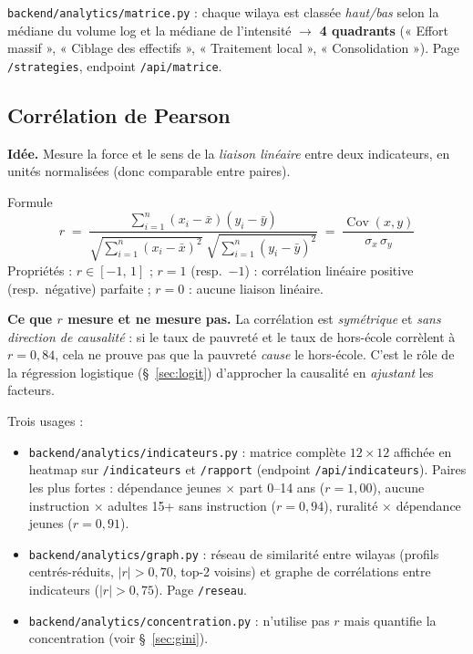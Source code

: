 \documentclass[11pt,a4paper]{article}
\newcommand{\txt}[1]{\texttt{#1}}
\begin{document}
\begin{where}
\txt{backend/analytics/matrice.py} : chaque wilaya est classée \emph{haut/bas}
selon la médiane du volume log et la médiane de l'intensité $\to$ \textbf{4
quadrants} (« Effort massif », « Ciblage des effectifs », « Traitement
local », « Consolidation »). Page \txt{/strategies}, endpoint \txt{/api/matrice}.
\end{where}

\subsection{Corrélation de Pearson}
\label{sec:pearson}

\textbf{Idée.} Mesure la force et le sens de la \emph{liaison linéaire} entre
deux indicateurs, en unités normalisées (donc comparable entre paires).

\begin{meth}{Formule}
\[
r \;=\;
\frac{\sum_{i=1}^{n}(x_i-\bar{x})(y_i-\bar{y})}
{\sqrt{\sum_{i=1}^{n}(x_i-\bar{x})^2}\;\sqrt{\sum_{i=1}^{n}(y_i-\bar{y})^2}}
\;=\;\frac{\operatorname{Cov}(x,y)}{\sigma_x\,\sigma_y}
\]
Propriétés : $r\in[-1,\,1]$ ; $r=1$ (resp.\ $-1$) : corrélation linéaire
positive (resp.\ négative) parfaite ; $r=0$ : aucune liaison linéaire.
\end{meth}

\begin{notebox}
\textbf{Ce que $r$ mesure et ne mesure pas.} La corrélation est \emph{symétrique}
et \emph{sans direction de causalité} : si le taux de pauvreté et le taux de
hors-école corrèlent à $r=0{,}84$, cela ne prouve pas que la pauvreté
\emph{cause} le hors-école. C'est le rôle de la régression logistique
(§~\ref{sec:logit}) d'approcher la causalité en \emph{ajustant} les facteurs.
\end{notebox}

\begin{where}
Trois usages :
\begin{itemize}[leftmargin=2em]
  \item \txt{backend/analytics/indicateurs.py} : matrice complète
        $12\times12$ affichée en heatmap sur \txt{/indicateurs} et
        \txt{/rapport} (endpoint \txt{/api/indicateurs}). Paires les plus
        fortes :
        dépendance jeunes $\times$ part 0--14 ans ($r=1{,}00$), aucune
        instruction $\times$ adultes 15+ sans instruction ($r=0{,}94$),
        ruralité $\times$ dépendance jeunes ($r=0{,}91$).
  \item \txt{backend/analytics/graph.py} : réseau de similarité entre
        wilayas (profils centrés-réduits, $|r|>0{,}70$, top-2 voisins) et
        graphe de corrélations entre indicateurs ($|r|>0{,}75$). Page
        \txt{/reseau}.
  \item \txt{backend/analytics/concentration.py} : n'utilise pas $r$ mais
        quantifie la concentration (voir §~\ref{sec:gini}).
\end{itemize}
\end{where}
\end{document}
